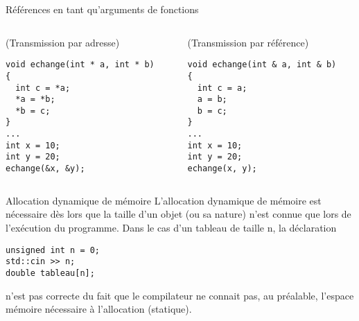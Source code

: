 \documentclass[c]{beamer}
\begin{document}
\begin{frame}[fragile]{Références en tant qu'arguments de fonctions}
 \begin{columns}
\begin{column}{0.5\columnwidth}
\begin{cbox}[][lwuc](Transmission par adresse)
\begin{verbatim}
void echange(int * a, int * b)
{
  int c = *a;
  *a = *b;
  *b = c;
}
...
int x = 10;
int y = 20;
echange(&x, &y);
\end{verbatim}

\pause
\end{cbox}
\end{column}

\begin{column}{0.5\columnwidth}
\begin{cbox}[][lwuc](Transmission par référence)
\begin{verbatim}
void echange(int & a, int & b)
{
  int c = a;
  a = b;
  b = c;
}
...
int x = 10;
int y = 20;
echange(x, y);
\end{verbatim}
\end{cbox}
\end{column}
\end{columns}
\end{frame}



\begin{frame}[fragile]{Allocation dynamique de mémoire}
 L'allocation dynamique de mémoire est nécessaire dès lors que la taille d'un
 objet (ou sa nature) n'est connue que lors de l'exécution du programme. Dans le cas
 d'un tableau de taille n, la déclaration

\begin{verbatim}
unsigned int n = 0;
std::cin >> n;
double tableau[n];
\end{verbatim}

n'est pas correcte du fait que le compilateur ne connait pas, au préalable, l'espace
mémoire nécessaire à l'allocation (statique).
\end{frame}

\end{document}
